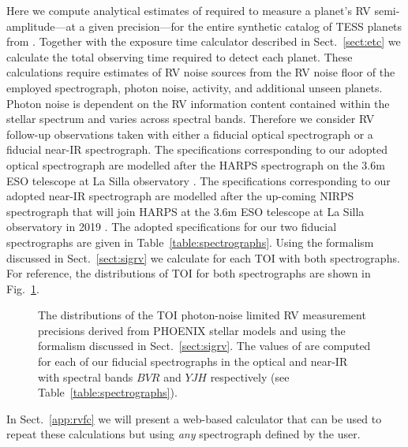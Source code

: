 Here we compute analytical estimates of \nrv{}
required to measure a planet's RV semi-amplitude---at a given precision---for the entire synthetic catalog
of TESS planets from . Together with the exposure time calculator described in
Sect.~\ref{sect:etc} we calculate the total observing time required to detect each planet. These calculations
require estimates of RV noise sources from the RV noise floor of the employed spectrograph,
photon noise, activity, and additional unseen planets. Photon noise
is dependent on the RV information content contained within the stellar spectrum and varies across spectral
bands. Therefore we consider RV follow-up observations taken with either a fiducial optical spectrograph
or a fiducial near-IR spectrograph. The specifications corresponding to our adopted optical spectrograph are
modelled after the HARPS spectrograph on the 3.6m ESO telescope at La Silla
observatory \citep{mayor03}. The specifications corresponding to our adopted near-IR spectrograph
are modelled after the up-coming NIRPS spectrograph that will join HARPS at the 3.6m ESO
telescope at La Silla observatory in 2019 \citep{bouchy17}. The adopted specifications for our
two fiducial spectrographs are given in Table~\ref{table:spectrographs}. Using the formalism discussed in
Sect.~\ref{sect:sigrv} we calculate \sigRV{} for each TOI with both spectrographs.
For reference, the distributions of TOI \sigRV{} for both spectrographs are shown in Fig.~\ref{fig:sigRV}. 

\begin{figure}
  \centering
  \caption{The distributions of the TOI photon-noise limited RV measurement precisions derived from
    PHOENIX stellar models and using the formalism discussed in Sect.~\ref{sect:sigrv}. The values of \sigRV{}
    are computed for each of our fiducial spectrographs in the optical and near-IR with spectral bands $BVR$
    and $YJH$ respectively (see Table~\ref{table:spectrographs}).}
  \label{fig:sigRV}
\end{figure}

In Sect.~\ref{app:rvfc}
we will present a web-based \nrv{(}\sigRV{)} calculator that can be used to repeat these calculations but
using \emph{any} spectrograph defined by the user.



